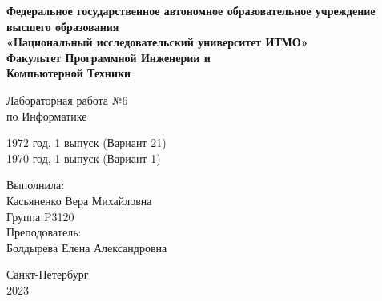 \begin{center}
\thispagestyle{empty}
\textbf{\large Федеральное государственное автономное 
        образовательное учреждение высшего образования \\
        «Национальный исследовательский университет ИТМО» \\
        Факультет Программной Инженерии и \\
        Компьютерной Техники}
        
\vspace{6cm}
\huge{ Лабораторная работа №6 \\
по Информатике}

\LARGE{1972 год, 1 выпуск (Вариант 21) \\
1970 год, 1 выпуск (Вариант 1)}

\vspace{3cm}
\begin{flushright}
\large { Выполнила: \\
Касьяненко Вера Михайловна \\
Группа P3120 \\
Преподователь: \\
Болдырева Елена Александровна }
\end{flushright}
\vspace{8cm}
\large {Санкт-Петербург \\
2023}
\end{center}